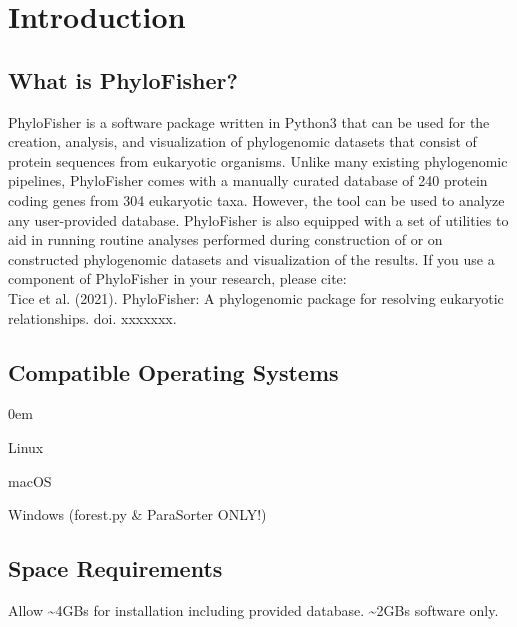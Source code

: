 \documentclass{article}
\begin{document}
    \pagebreak
    \section{Introduction}\label{sec:Intro}
        \subsection*{What is PhyloFisher?}
            PhyloFisher is a software package written in Python3 that can be used for the creation, analysis, and visualization of phylogenomic datasets that consist of protein sequences from eukaryotic organisms. Unlike many existing phylogenomic pipelines, PhyloFisher comes with a manually curated database of 240 protein coding genes from 304 eukaryotic taxa. However, the tool can be used to analyze any user-provided database. PhyloFisher is also equipped with a set of utilities to aid in running routine analyses performed during construction of or on constructed phylogenomic datasets and visualization of the results. If you use a component of PhyloFisher in your research, please cite:\\
            
            Tice et al. (2021). PhyloFisher: A phylogenomic package for resolving eukaryotic relationships. doi. xxxxxxx. 
        
        \subsection{Compatible Operating Systems}
            \begin{description}
                \itemsep0em
                    \item Linux
                    \item macOS
                    \item Windows (forest.py \& ParaSorter ONLY!)
            \end{description}

        
        \subsection{Space Requirements}
            Allow \textasciitilde4GBs for installation including provided database. \textasciitilde2GBs software only. %
        
\end{document}

